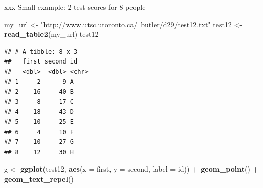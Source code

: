 \documentclass[ignorenonframetext,]{beamer}
\newenvironment{Shaded}{\begin{snugshade}}{\end{snugshade}}
\newcommand{\DataTypeTok}[1]{\textcolor[rgb]{0.13,0.29,0.53}{#1}}
\newcommand{\KeywordTok}[1]{\textcolor[rgb]{0.13,0.29,0.53}{\textbf{#1}}}
\newcommand{\NormalTok}[1]{#1}
\newcommand{\OperatorTok}[1]{\textcolor[rgb]{0.81,0.36,0.00}{\textbf{#1}}}
\newcommand{\StringTok}[1]{\textcolor[rgb]{0.31,0.60,0.02}{#1}}
\begin{document}
\begin{frame}[fragile]{xxx Small example: 2 test scores for 8 people}
\protect\hypertarget{xxx-small-example-2-test-scores-for-8-people}{}

\small

\begin{Shaded}
\begin{Highlighting}[]
\NormalTok{my_url <-}\StringTok{ "http://www.utsc.utoronto.ca/~butler/d29/test12.txt"}
\NormalTok{test12 <-}\StringTok{ }\KeywordTok{read_table2}\NormalTok{(my_url)}
\NormalTok{test12}
\end{Highlighting}
\end{Shaded}

\begin{verbatim}
## # A tibble: 8 x 3
##   first second id   
##   <dbl>  <dbl> <chr>
## 1     2      9 A    
## 2    16     40 B    
## 3     8     17 C    
## 4    18     43 D    
## 5    10     25 E    
## 6     4     10 F    
## 7    10     27 G    
## 8    12     30 H
\end{verbatim}

\begin{Shaded}
\begin{Highlighting}[]
\NormalTok{g <-}\StringTok{ }\KeywordTok{ggplot}\NormalTok{(test12, }\KeywordTok{aes}\NormalTok{(}\DataTypeTok{x =}\NormalTok{ first, }\DataTypeTok{y =}\NormalTok{ second, }\DataTypeTok{label =}\NormalTok{ id)) }\OperatorTok{+}
\StringTok{  }\KeywordTok{geom_point}\NormalTok{() }\OperatorTok{+}\StringTok{ }\KeywordTok{geom_text_repel}\NormalTok{()}
\end{Highlighting}
\end{Shaded}

\normalsize

\end{frame}
\end{document}
